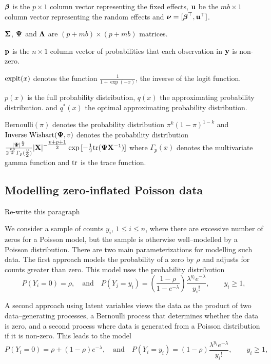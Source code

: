 \documentclass{amsart}[12pt]
\newcommand{\mgc}[1]{{\color{blue}#1}}
\begin{document}
${\boldsymbol \beta}$ is the $p \times 1$ column vector representing the fixed effects,
${\bf u}$ be the $m b \times 1$ column vector representing the random effects
and ${\boldsymbol \nu} = [{\boldsymbol \beta}^\top, {\bf u}^\top]$.

${\boldsymbol \Sigma}$, ${\boldsymbol \Psi}$ and ${\boldsymbol \Lambda}$ are $(p + m b) \times (p + m b)$ matrices.

${\bf p}$ is the $n \times 1$ column vector of probabilities that each observation in ${\bf y}$ is non-zero.

$\text{expit} (x)$ denotes the function $\tfrac{1}{1 + \exp(-x)}$, the inverse of the logit function.

$p(x)$ is the full probability distribution, $q(x)$ the approximating probability distribution.
and $q^*(x)$ the optimal approximating probability distribution.

$\text{Bernoulli}(\pi)$ denotes the probability distribution $\pi^k (1 - \pi)^{1-k}$
and $\text{Inverse Wishart}({\boldsymbol \Psi}, v)$ denotes the probability distribution
$\tfrac{|{\boldsymbol \Psi}|^\frac{v}{2}}{2^{\frac{vp}{2}} \Gamma_p{(\tfrac{v}{2})}} |{\bf X}|^{-\tfrac{v + p + 1}{2}} \exp{[- \tfrac{1}{2} \text{tr}{({\boldsymbol\Psi}{\bf X}^{-1})}]}$ where $\Gamma_p{(x)}$ denotes the multivariate gamma function and
$\text{tr}$ is the trace function.

\subsection{Modelling zero-inflated Poisson data}

\mgc{Re-write this paragraph}

We consider a sample of counts $y_i$, $1 \le i\le n$, where there are excessive number of zeros for a Poisson
model, but the sample is otherwise well--modelled by a Poisson distribution. There are two main
parameterizations for modelling such data. The first approach models the probability of a zero by $\rho$ and
adjusts for counts greater than zero. This model uses the probability distribution
$$
P(Y_i = 0) = \rho, 
\quad \mbox{and} \quad 
P(Y_j = y_i) = \left( \frac{1 - \rho}{1 - e^{-\lambda}} \right) \frac{\lambda^{y_i} e^{-\lambda}} {y_i!},\qquad y_i \ge 1,
$$


A second approach using latent variables views the data as the product of two data--generating processes, a
Bernoulli process that determines whether the data is zero, and a second process where data is generated from
a Poisson distribution if it is non-zero. This leads to the model
\begin{equation}\label{eq:modelTwo}
	P(Y_i = 0) = \rho + (1 - \rho) e^{-\lambda}, 
	\quad \mbox{and} \quad 
	P(Y_i = y_i) = (1 - \rho) \frac{\lambda^{y_i} e^{-\lambda}} {y_i!},\qquad y_i \ge 1,
\end{equation}
\end{document}
